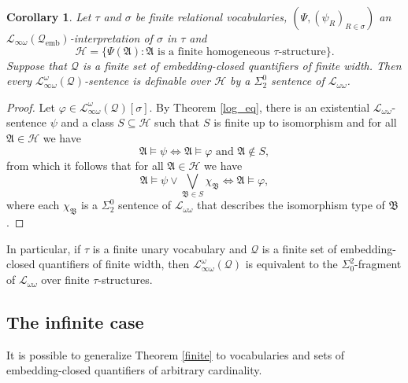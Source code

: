 \documentclass{ndjflart}
\theoremstyle{plain}
\newtheorem{corollary}[conjecture]{Corollary}
\theoremstyle{definition}
\numberwithin{equation}{section}
\DeclareMathOperator{\emb}{emb}
\begin{document}
\begin{corollary}
Let $\tau$ and $\sigma$ be finite relational vocabularies,
$(\Psi, (\psi_R)_{R \in \sigma})$ an 
$\mathcal{L}_{\infty \omega}(\mathcal{Q}_{\emb})$-interpretation of $\sigma$ in
$\tau$ and
\[
\mathcal{H} = \{\Psi(\mathfrak{A}) 
\colon \mathfrak{A} \text{ is a finite homogeneous } \tau \text{-structure}\}.
\]
Suppose that $\mathcal{Q}$ is a finite set of embedding-closed quantifiers of
finite width.
Then every $\mathcal{L}^{\omega}_{\infty\omega}(\mathcal{Q})$-sentence is
definable over $\mathcal{H}$ by a $\Sigma^0_2$ sentence of
$\mathcal{L}_{\omega\omega}$.
\end{corollary}
\begin{proof}
Let $\varphi \in \mathcal{L}^{\omega}_{\infty\omega}(\mathcal{Q})[\sigma]$.
By Theorem \ref{log_eq}, there is an existential
$\mathcal{L}_{\omega\omega}$-sentence $\psi$ and a class
$S \subseteq \mathcal{H}$ such that $S$ is finite up to isomorphism and for all
$\mathfrak{A} \in \mathcal{H}$ we have
\[
	\mathfrak{A} \vDash \psi 
	\Leftrightarrow \mathfrak{A} \vDash \varphi \text{ and } \mathfrak{A} \notin S,
\]
from which it follows that for all $\mathfrak{A} \in \mathcal{H}$ we have
\[
	\mathfrak{A} \vDash \psi \vee \bigvee_{\mathfrak{B} \in S} \chi_{\mathfrak{B}} 
	\Leftrightarrow \mathfrak{A} \vDash \varphi,
\]
where each $\chi_{\mathfrak{B}}$ is a $\Sigma_2^0$ sentence of
$\mathcal{L}_{\omega \omega}$ that describes the isomorphism type of $\mathfrak{B}$.
\end{proof}

In particular, if $\tau$ is a finite unary vocabulary and $\mathcal{Q}$ is a
finite set of embedding-closed quantifiers of finite width, then
$\mathcal{L}_{\infty\omega}^{\omega}(\mathcal{Q})$ is equivalent to the
$\Sigma_0^2$-fragment of $\mathcal{L}_{\omega\omega}$ over finite $\tau$-structures.


\subsection{The infinite case}

It is possible to generalize Theorem \ref{finite} to vocabularies and sets of
embedding-closed quantifiers of arbitrary cardinality.
\end{document}
